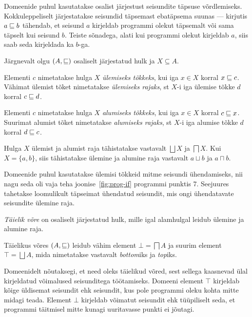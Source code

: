 \documentclass[../thesis.tex]{subfiles}
\begin{document}
Domeenide puhul kasutatakse osalist järjestust seisundite täpsuse võrdlemiseks. Kokkuleppeliselt järjestatakse seisundid täpsemast ebatäpsema suunas --- kirjutis $a \sqsubseteq b$ tähendab, et seisund $a$ kirjeldab programmi olekut täpsemalt või sama täpselt kui seisund $b$. Teiste sõnadega, alati kui programmi olekut kirjeldab $a$, siis saab seda kirjeldada ka $b$-ga.

\noindent
Järgnevalt olgu $(A, \sqsubseteq)$ osaliselt järjestatud hulk ja $X \subseteq A$.

\begin{definition}
\label{def:join}
Elementi $c$ nimetatakse hulga $X$ \emph{ülemiseks tõkkeks}, kui iga $x \in X$ korral $x \sqsubseteq c$. Vähimat ülemist tõket nimetatakse \emph{ülemiseks rajaks}, st $X$-i iga ülemise tõkke $d$ korral $c \sqsubseteq d$.
\end{definition}

\begin{definition}
\label{def:meet}
Elementi $c$ nimetatakse hulga $X$ \emph{alumiseks tõkkeks}, kui iga $x \in X$ korral $c \sqsubseteq x$. Suurimat alumist tõket nimetatakse \emph{alumiseks rajaks}, st $X$-i iga alumise tõkke $d$ korral $d \sqsubseteq c$.
\end{definition}

Hulga $X$ ülemist ja alumist raja tähistatakse vastavalt $\bigsqcup X$ ja $\bigsqcap X$. Kui $X = \{a, b\}$, siis tähistatakse ülemine ja alumine raja vastavalt $a \sqcup b$ ja $a \sqcap b$.

Domeenide puhul kasutatakse ülemisi tõkkeid mitme seisundi ühendamiseks, nii nagu seda oli vaja teha joonise~\ref{fig:prog-if} programmi punktis 7. Seejuures tahetakse loomulikult täpseimat ühendatud seisundit, mis ongi ühendatavate seisundite ülemine raja.

\begin{definition}
\emph{Täielik võre} on osaliselt järjestatud hulk, mille igal alamhulgal leidub ülemine ja alumine raja.
\end{definition}

Täielikus võres $(A, \sqsubseteq)$ leidub vähim element $\bot = \bigsqcap A$ ja suurim element $\top = \bigsqcup A$, mida nimetatakse vastavalt \textit{bottom}iks ja \textit{top}iks.

Domeenidelt nõutaksegi, et need oleks täielikud võred, sest sellega kaasnevad ülal kirjeldatud võimalused seisunditega töötamiseks. Domeeni element $\top$ kirjeldab kõige üldisemat seisundit ehk seisundit, kus pole programmi oleku kohta mitte midagi teada. Element $\bot$ kirjeldab võimatut seisundit ehk tüüpiliselt seda, et programmi täitmisel mitte kunagi uuritavasse punkti ei jõutagi.
\end{document}
